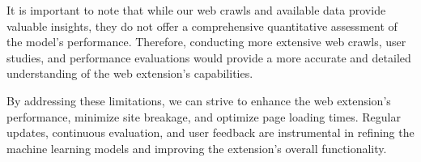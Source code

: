 It is important to note that while our web crawls and available data provide valuable insights, they do not offer a 
comprehensive quantitative assessment of the model's performance. Therefore, conducting more extensive web crawls, user studies,
and performance evaluations would provide a more accurate and detailed understanding of the web extension's capabilities.

By addressing these limitations, we can strive to enhance the web extension's performance, minimize site breakage, and optimize
page loading times. Regular updates, continuous evaluation, and user feedback are instrumental in refining the machine learning models
and improving the extension's overall functionality.


